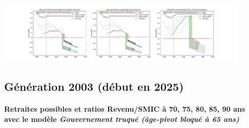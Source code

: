  \begin{center}\includegraphics[width=0.9\textwidth]{fig/TechHosp_1990_22_dest_retraite.pdf}\end{center} \label{fig/TechHosp_1990_22_dest_retraite.pdf} 

\newpage 
 
\subsection{Génération 2003 (début en 2025)} 

\paragraph{Retraites possibles et ratios Revenu/SMIC à 70, 75, 80, 85, 90 ans avec le modèle \emph{Gouvernement truqué (âge-pivot bloqué à 65 ans)}}  
 
